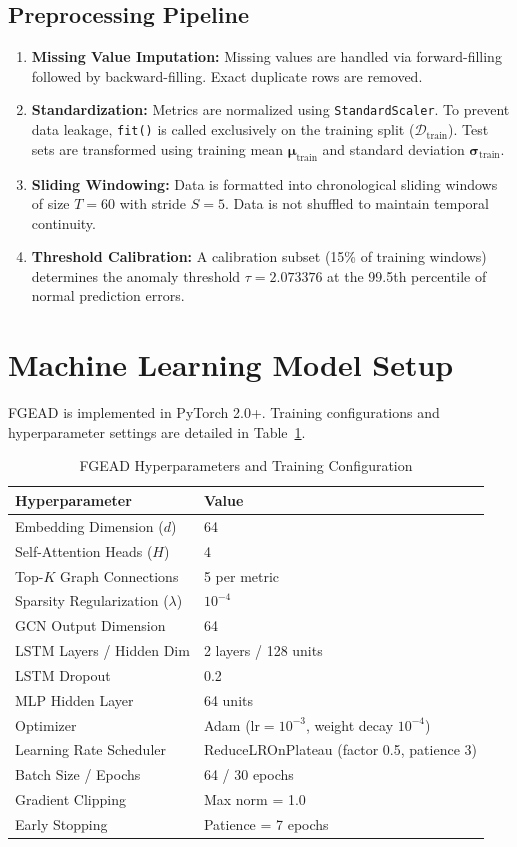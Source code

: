 \documentclass[conference]{IEEEtran}
\begin{document}
\subsection{Preprocessing Pipeline}
\begin{enumerate}
    \item \textbf{Missing Value Imputation:} Missing values are handled via forward-filling followed by backward-filling. Exact duplicate rows are removed.
    \item \textbf{Standardization:} Metrics are normalized using \texttt{StandardScaler}. To prevent data leakage, \texttt{fit()} is called exclusively on the training split ($\mathcal{D}_{\text{train}}$). Test sets are transformed using training mean $\boldsymbol{\mu}_{\text{train}}$ and standard deviation $\boldsymbol{\sigma}_{\text{train}}$.
    \item \textbf{Sliding Windowing:} Data is formatted into chronological sliding windows of size $T=60$ with stride $S=5$. Data is not shuffled to maintain temporal continuity.
    \item \textbf{Threshold Calibration:} A calibration subset (15\% of training windows) determines the anomaly threshold $\tau = 2.073376$ at the 99.5th percentile of normal prediction errors.
\end{enumerate}

\section{Machine Learning Model Setup}
FGEAD is implemented in PyTorch 2.0+. Training configurations and hyperparameter settings are detailed in Table~\ref{tab:model_config}.

\begin{table}[h]
\caption{FGEAD Hyperparameters and Training Configuration}
\label{tab:model_config}
\centering
\begin{tabular}{ll}
\toprule
\textbf{Hyperparameter} & \textbf{Value} \\
\midrule
Embedding Dimension ($d$) & 64 \\
Self-Attention Heads ($H$) & 4 \\
Top-$K$ Graph Connections & 5 per metric \\
Sparsity Regularization ($\lambda$) & $10^{-4}$ \\
GCN Output Dimension & 64 \\
LSTM Layers / Hidden Dim & 2 layers / 128 units \\
LSTM Dropout & 0.2 \\
MLP Hidden Layer & 64 units \\
Optimizer & Adam ($\text{lr}=10^{-3}$, weight decay $10^{-4}$) \\
Learning Rate Scheduler & ReduceLROnPlateau (factor 0.5, patience 3) \\
Batch Size / Epochs & 64 / 30 epochs \\
Gradient Clipping & Max norm = 1.0 \\
Early Stopping & Patience = 7 epochs \\
\bottomrule
\end{tabular}
\end{table}
\end{document}
